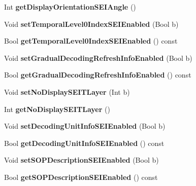 \begin{DoxyCompactItemize}
\mbox{\label{class_t_enc_cfg_a5cb6be3777150bd60661845fd87478aa}} 
Int {\bfseries get\+Display\+Orientation\+S\+E\+I\+Angle} ()
\item 
\mbox{\label{class_t_enc_cfg_ac5984b4009a7768c9fa000f650c854de}} 
Void {\bfseries set\+Temporal\+Level0\+Index\+S\+E\+I\+Enabled} (Bool b)
\item 
\mbox{\label{class_t_enc_cfg_a213d068491b85e5c1998e606b70993cf}} 
Bool {\bfseries get\+Temporal\+Level0\+Index\+S\+E\+I\+Enabled} () const
\item 
\mbox{\label{class_t_enc_cfg_a3a8a1603822aa70a04843caafe780a5f}} 
Void {\bfseries set\+Gradual\+Decoding\+Refresh\+Info\+Enabled} (Bool b)
\item 
\mbox{\label{class_t_enc_cfg_ae4f076614eb5b16a56c9001e129a9d60}} 
Bool {\bfseries get\+Gradual\+Decoding\+Refresh\+Info\+Enabled} () const
\item 
\mbox{\label{class_t_enc_cfg_a8db0708abe2236cdd2b2e5f3146e00af}} 
Void {\bfseries set\+No\+Display\+S\+E\+I\+T\+Layer} (Int b)
\item 
\mbox{\label{class_t_enc_cfg_a20c86eed9296ce18943a6198fb9fae2f}} 
Int {\bfseries get\+No\+Display\+S\+E\+I\+T\+Layer} ()
\item 
\mbox{\label{class_t_enc_cfg_ac77d6a67e5040996af14d8313f19c7c8}} 
Void {\bfseries set\+Decoding\+Unit\+Info\+S\+E\+I\+Enabled} (Bool b)
\item 
\mbox{\label{class_t_enc_cfg_a95112fc47e4ee014784df9921328188a}} 
Bool {\bfseries get\+Decoding\+Unit\+Info\+S\+E\+I\+Enabled} () const
\item 
\mbox{\label{class_t_enc_cfg_a416d505f77b57fc42764b2107f1bf500}} 
Void {\bfseries set\+S\+O\+P\+Description\+S\+E\+I\+Enabled} (Bool b)
\item 
\mbox{\label{class_t_enc_cfg_a36606e79861a85b1aa79bf85425d4afc}} 
Bool {\bfseries get\+S\+O\+P\+Description\+S\+E\+I\+Enabled} () const

\end{DoxyCompactItemize}
